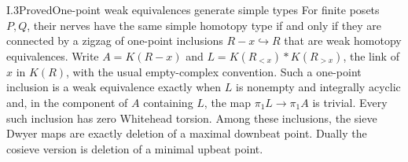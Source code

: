 \begin{claim}{I.3}{Proved}{One-point weak equivalences generate simple types}
For finite posets $P,Q$, their nerves have the same simple homotopy type
if and only if they are connected by a zigzag of one-point inclusions
$R-x\hookrightarrow R$ that are weak homotopy equivalences.
Write $A=K(R-x)$ and
$L=K(R_{<x})*K(R_{>x})$, the link of $x$ in $K(R)$, with the usual
empty-complex convention. Such a one-point inclusion is a weak
equivalence exactly when $L$ is nonempty and integrally acyclic and,
in the component of $A$ containing $L$, the map
$\pi_1 L\to\pi_1 A$ is trivial. Every such inclusion has zero
Whitehead torsion. Among these inclusions, the sieve Dwyer maps are
exactly deletion of a maximal downbeat point. Dually the cosieve
version is deletion of a minimal upbeat point.
\end{claim}
